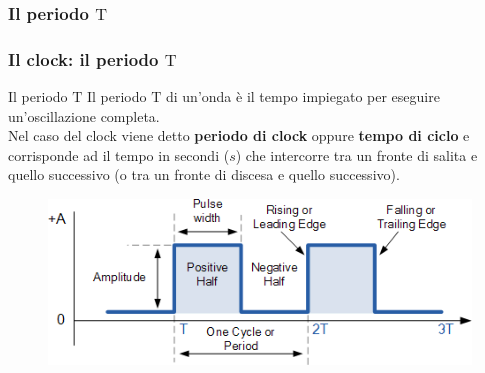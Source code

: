 \subsubsection[Il periodo $\mathrm{T}$]{Il periodo $\mathrm{T}$}
\begin{frame}
	\frametitle{Il clock: il periodo $\mathrm{T}$}
	
	\begin{block}{Il periodo $\mathrm{T}$}
		Il periodo $\mathrm{T}$ di un'onda è il tempo impiegato per eseguire un'oscillazione completa.\\
		Nel caso del clock viene detto \textbf{periodo di clock} oppure \textbf{tempo di ciclo} e corrisponde ad il tempo in secondi ($s$) che intercorre tra un fronte di salita e quello successivo (o tra un fronte di discesa e quello successivo).
	\end{block}
	
	\begin{figure}[!htbp]
		\centering 
		\includegraphics[width=0.78\linewidth]{images/2_le_architetture/clock.png}
	\end{figure}
	
\end{frame}


